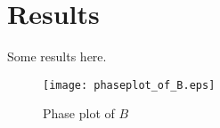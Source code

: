 \chapter{Results} \label{sec:results}

Some results here.

\begin{figure}[t]
    \centering
    \texttt{[image: phaseplot\_of\_B.eps]}
    \caption{Phase plot of $B$}
    \label{fig:phaseplot_of_B}
\end{figure}
